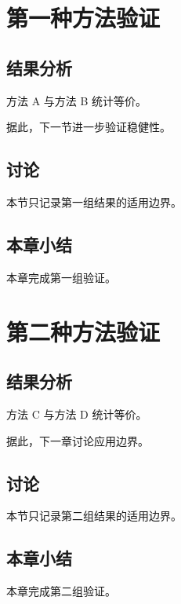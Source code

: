 \chapter{第一种方法验证}
\section{结果分析}
方法 A 与方法 B 统计等价。

据此，下一节进一步验证稳健性。
\section{讨论}
本节只记录第一组结果的适用边界。
\section{本章小结}
本章完成第一组验证。

\chapter{第二种方法验证}
\section{结果分析}
方法 C 与方法 D 统计等价。

据此，下一章讨论应用边界。
\section{讨论}
本节只记录第二组结果的适用边界。
\section{本章小结}
本章完成第二组验证。

